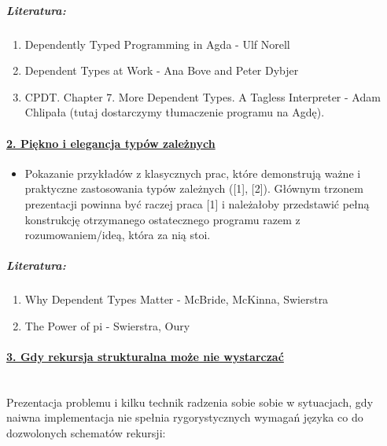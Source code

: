 \documentclass[10pt, a4paper]{article}
\begin{document}
\subparagraph{Literatura:}

\begin{enumerate}
\addtolength{\itemsep}{-0.5\baselineskip}
 \item  Dependently Typed Programming in Agda - Ulf Norell
 \item  Dependent Types at Work - Ana Bove and Peter Dybjer
 \item  CPDT. Chapter 7. More Dependent Types. A Tagless Interpreter - Adam Chlipała (tutaj dostarczymy tłumaczenie programu na Agdę).
\end{enumerate}

\paragraph{\underline{2. Piękno i elegancja typów zależnych}}

\begin{itemize}
 \item 
Pokazanie przykładów z klasycznych prac, które demonstrują ważne i praktyczne zastosowania typów zależnych ([1], [2]). Głównym trzonem prezentacji powinna być raczej praca [1] i należałoby przedstawić pełną konstrukcję otrzymanego ostatecznego programu razem z rozumowaniem/ideą, która za nią stoi.
\end{itemize}

\subparagraph{Literatura:}

\begin{enumerate}
\addtolength{\itemsep}{-0.5\baselineskip}

 \item Why Dependent Types Matter - McBride, McKinna, Swierstra
 \item The Power of pi - Swierstra, Oury
\end{enumerate}

\paragraph{\underline{3. Gdy rekursja strukturalna może nie wystarczać}}
~ \\

Prezentacja problemu i kilku technik radzenia sobie sobie w sytuacjach, gdy naiwna implementacja nie spełnia rygorystycznych wymagań języka co do dozwolonych schematów rekursji:
\end{document}
